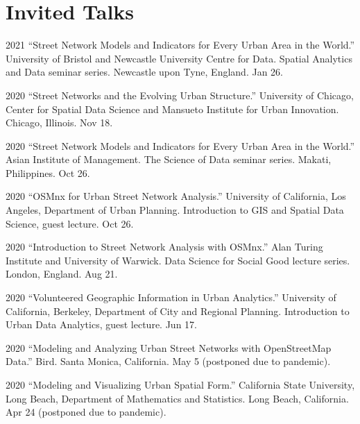 \documentclass[12pt,letterpaper]{report}
\begin{document}
    \section*{Invited Talks}

    \begin{tablist}

        \item[2021] \tab \enquote{Street Network Models and Indicators for Every Urban Area in the World.} University of Bristol and Newcastle University Centre for Data. Spatial Analytics and Data seminar series. Newcastle upon Tyne, England. Jan 26.

        \item[2020] \tab \enquote{Street Networks and the Evolving Urban Structure.} University of Chicago, Center for Spatial Data Science and Mansueto Institute for Urban Innovation. Chicago, Illinois. Nov 18.

        \item[2020] \tab \enquote{Street Network Models and Indicators for Every Urban Area in the World.} Asian Institute of Management. The Science of Data seminar series. Makati, Philippines. Oct 26.

        \item[2020] \tab \enquote{OSMnx for Urban Street Network Analysis.} University of California, Los Angeles, Department of Urban Planning. Introduction to GIS and Spatial Data Science, guest lecture. Oct 26.

        \item[2020] \tab \enquote{Introduction to Street Network Analysis with OSMnx.} Alan Turing Institute and University of Warwick. Data Science for Social Good lecture series. London, England. Aug 21.

        \item[2020] \tab \enquote{Volunteered Geographic Information in Urban Analytics.} University of California, Berkeley, Department of City and Regional Planning. Introduction to Urban Data Analytics, guest lecture. Jun 17.

        \item[2020] \tab \enquote{Modeling and Analyzing Urban Street Networks with OpenStreetMap Data.} Bird. Santa Monica, California. May 5 (postponed due to pandemic).

        \item[2020] \tab \enquote{Modeling and Visualizing Urban Spatial Form.} California State University, Long Beach, Department of Mathematics and Statistics. Long Beach, California. Apr 24 (postponed due to pandemic).


\end{tablist}
\end{document}
